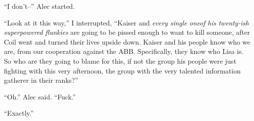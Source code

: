 ``I don't--'' Alec started.



``Look at it this way,'' I interrupted, ``Kaiser and \emph{every single one}\emph{of his twenty-ish superpowered flunkies }are going to be pissed enough to want to kill someone, after Coil went and turned their lives upside down.  Kaiser and his people know who we are, from our cooperation against the ABB.  Specifically, they know who Lisa is.  So who are they going to blame for this, if not the group his people were just fighting with this very afternoon, the group with the very talented information gatherer in their ranks?''



``Oh.''  Alec said.  ``Fuck.''



``Exactly.''





